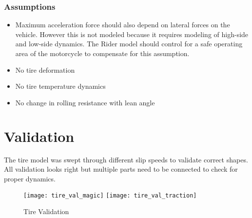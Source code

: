 \documentclass[../SimBALink.tex]{subfiles}
\begin{document}
\subsubsection{Assumptions}
\begin{itemize}
  \item Maximum acceleration force should also depend on lateral forces on the vehicle. However this is not modeled because it requires modeling of high-side and low-side dynamics. The Rider model should control for a safe operating area of the motorcycle to compensate for this assumption. 
  \item No tire deformation
  \item No tire temperature dynamics
  \item No change in rolling resistance with lean angle 
\end{itemize}

\section{Validation}

The tire model was swept through different slip speeds to validate correct shapes. All validation looks right but multiple parts need to be connected to check for proper dynamics. 

\begin{figure}[bp!]
\center
 \texttt{[image: tire\_val\_magic]}
 \texttt{[image: tire\_val\_traction]}
  \caption{Tire Validation}
\end{figure}
\end{document}
